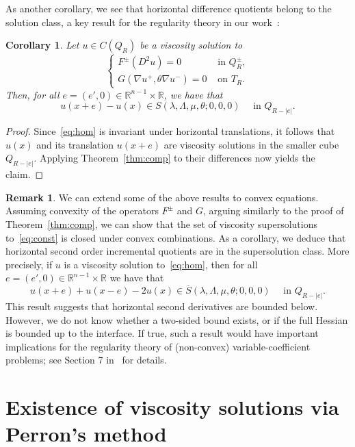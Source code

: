 \documentclass[letter,11pt]{amsart}
\newcommand{\R}{\mathbb{R}}
\newtheorem{cor}[thm]{Corollary}
\theoremstyle{definition}
\newtheorem{rem}[thm]{Remark}
\numberwithin{equation}{section}
\begin{document}
As another corollary, we see that horizontal difference quotients belong to the solution class, a key result for the regularity theory in our work~\cite{E}:
\begin{cor}
Let $u \in C(Q_R)$ be a viscosity solution to
\begin{equation}
\label{eq:hom}
\begin{cases}
F^{\pm}(D^2 u) = 0 & \text{ in } Q^{\pm}_R,\\
G(\nabla u^{+}, \theta \nabla u^{-}) = 0 & \text{ on } T_R.
\end{cases}
\end{equation}
Then, for all $e =(e', 0) \in \R^{n-1} \times \R$, we have that
\[
u(x + e) - u(x) \in S(\lambda,\Lambda,\mu,\theta; 0,0, 0) \quad \text{ in } Q_{R-|e|}.
\]
\end{cor}
\begin{proof}
Since~\eqref{eq:hom} is invariant under horizontal translations, it follows that $u(x)$ and its translation $u(x + e)$ are viscosity solutions in the smaller cube $Q_{R-|e|}$.
Applying Theorem~\ref{thm:comp} to their differences now yields the claim.
\end{proof}

\begin{rem}
We can extend some of the above results to convex equations.
Assuming convexity of the operators $F^{\pm}$ and $G$, arguing similarly to the proof of Theorem~\ref{thm:comp}, we can show that the set of viscosity supersolutions to~\eqref{eq:const} is closed under convex combinations.
As a corollary, we deduce that horizontal second order incremental quotients are in the supersolution class.
More precisely,  if $u$ is a viscosity solution to~\eqref{eq:hom}, then for all $e = (e',0) \in \R^{n-1} \times \R$ we have that
\[
u(x+e) + u(x-e) - 2 u(x) \in \overline{S}(\lambda, \Lambda, \mu, \theta; 0,0,0) \quad \text{ in } Q_{R-|e|}.
\]
This result suggests that horizontal second derivatives are bounded below.
However, we do not know whether a two-sided bound exists, or if the full Hessian is bounded up to the interface.
If true, such a result would have important implications for the regularity theory of (non-convex) variable-coefficient problems; see Section 7 in~\cite{E} for details.
\end{rem}


\medskip

\section{Existence of viscosity solutions via Perron's method}
\label{sec:perron}
\end{document}
